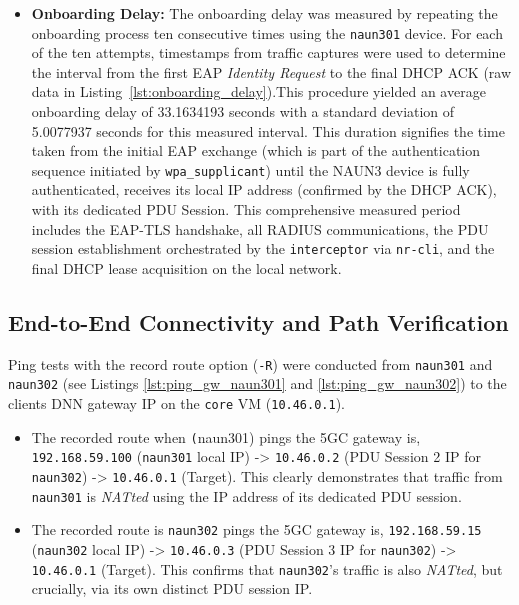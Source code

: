 \begin{itemize}
    \item \textbf{Onboarding Delay:} The onboarding delay was measured by repeating the onboarding process ten consecutive times using the \texttt{naun301} device. For each of the ten attempts, timestamps from traffic captures were used to determine the interval from the first \ac{EAP} \textit{Identity Request} to the final \ac{DHCP} ACK (raw data in Listing~\ref{lst:onboarding_delay}).This procedure yielded an average onboarding delay of 33.1634193 seconds with a standard deviation of 5.0077937 seconds for this measured interval. This duration signifies the time taken from the initial \ac{EAP} exchange (which is part of the authentication sequence initiated by \texttt{wpa\_supplicant}) until the \ac{NAUN3} device is fully authenticated, receives its local \ac{IP} address (confirmed by the \ac{DHCP} ACK), with its dedicated \ac{PDU} Session. This comprehensive measured period includes the \ac{EAP-TLS} handshake, all \ac{RADIUS} communications, the \ac{PDU} session establishment orchestrated by the \texttt{interceptor} via \texttt{nr-cli}, and the final \ac{DHCP} lease acquisition on the local network.
\end{itemize}

\subsection{End-to-End Connectivity and Path Verification}

Ping tests with the record route option (\texttt{-R}) were conducted from \texttt{naun301} and \texttt{naun302} (see Listings \ref{lst:ping_gw_naun301} and \ref{lst:ping_gw_naun302}) to the clients \ac{DNN} gateway \ac{IP} on the \texttt{core} \ac{VM} (\texttt{10.46.0.1}).

\begin{itemize}
    \item The recorded route when \texttt(naun301) pings the \ac{5GC} gateway is, \texttt{192.168.59.100} (\texttt{naun301} local \ac{IP}) -> \texttt{10.46.0.2} (\ac{PDU} Session 2 \ac{IP} for \texttt{naun302}) -> \texttt{10.46.0.1} (Target). This clearly demonstrates that traffic from \texttt{naun301} is \textit{NATted} using the \ac{IP} address of its dedicated \ac{PDU} session.

    \item The recorded route is \texttt{naun302} pings the \ac{5GC} gateway is, \texttt{192.168.59.15} (\texttt{naun302} local \ac{IP}) -> \texttt{10.46.0.3} (\ac{PDU} Session 3 \ac{IP} for \texttt{naun302}) -> \texttt{10.46.0.1} (Target). This confirms that \texttt{naun302}'s traffic is also \textit{NATted}, but crucially, via its own distinct \ac{PDU} session \ac{IP}.
\end{itemize}

